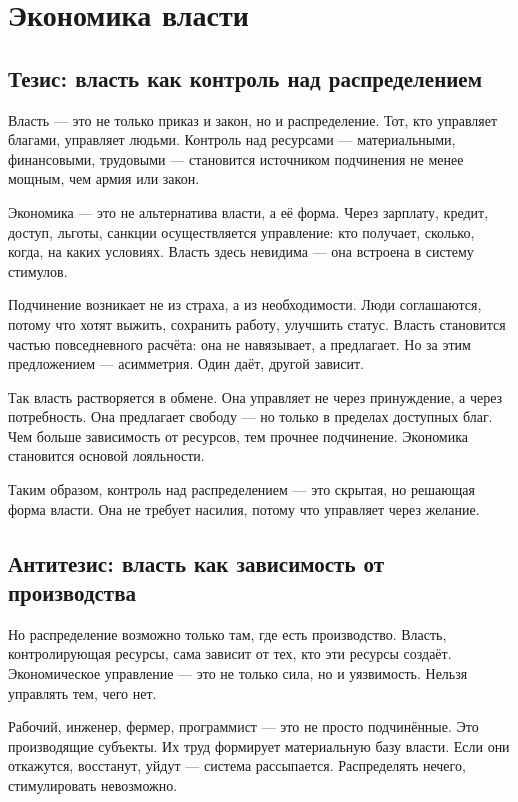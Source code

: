 \chapter{Экономика власти}

\section{Тезис: власть как контроль над распределением}

Власть — это не только приказ и закон, но и распределение. Тот, кто управляет благами, управляет людьми. Контроль над ресурсами — материальными, финансовыми, трудовыми — становится источником подчинения не менее мощным, чем армия или закон.

Экономика — это не альтернатива власти, а её форма. Через зарплату, кредит, доступ, льготы, санкции осуществляется управление: кто получает, сколько, когда, на каких условиях. Власть здесь невидима — она встроена в систему стимулов.

Подчинение возникает не из страха, а из необходимости. Люди соглашаются, потому что хотят выжить, сохранить работу, улучшить статус. Власть становится частью повседневного расчёта: она не навязывает, а предлагает. Но за этим предложением — асимметрия. Один даёт, другой зависит.

Так власть растворяется в обмене. Она управляет не через принуждение, а через потребность. Она предлагает свободу — но только в пределах доступных благ. Чем больше зависимость от ресурсов, тем прочнее подчинение. Экономика становится основой лояльности.

Таким образом, контроль над распределением — это скрытая, но решающая форма власти. Она не требует насилия, потому что управляет через желание.

\section{Антитезис: власть как зависимость от производства}

Но распределение возможно только там, где есть производство. Власть, контролирующая ресурсы, сама зависит от тех, кто эти ресурсы создаёт. Экономическое управление — это не только сила, но и уязвимость. Нельзя управлять тем, чего нет.

Рабочий, инженер, фермер, программист — это не просто подчинённые. Это производящие субъекты. Их труд формирует материальную базу власти. Если они откажутся, восстанут, уйдут — система рассыпается. Распределять нечего, стимулировать невозможно.

